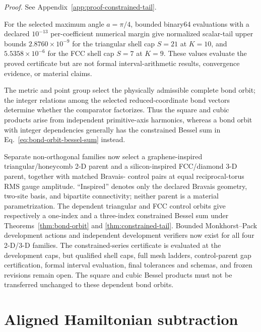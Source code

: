 \documentclass[11pt]{article}
\newenvironment{prospective}{\color{prospectivered}}{}
\begin{document}
\noindent\emph{Proof.} See Appendix~\ref{app:proof-constrained-tail}.


For the selected maximum angle $a=\pi/4$, bounded binary64 evaluations with a declared
$10^{-13}$ per-coefficient numerical margin give normalized scalar-tail upper bounds
$2.8760\times10^{-9}$ for the triangular shell cap $S=21$ at $K=10$, and
$5.5358\times10^{-6}$ for the FCC shell cap $S=7$ at $K=9$. These values evaluate the
proved certificate but are not formal interval-arithmetic results, convergence evidence,
or material claims.

The metric and point group select the physically admissible complete bond orbit; the
integer relations among the selected reduced-coordinate bond vectors determine whether
the comparator factorizes. Thus the square and cubic products arise from independent
primitive-axis harmonics, whereas a bond orbit with integer dependencies generally has
the constrained Bessel sum in Eq.~\eqref{eq:bond-orbit-bessel-sum} instead.

\begin{prospective}
Separate non-orthogonal families now select a graphene-inspired triangular/honeycomb
2-D parent and a silicon-inspired FCC/diamond 3-D parent, together with matched Bravais-
control pairs at equal reciprocal-torus RMS gauge amplitude. ``Inspired'' denotes only
the declared Bravais geometry, two-site basis, and bipartite connectivity; neither parent
is a material parametrization. The dependent triangular and FCC control orbits give
respectively a one-index and a three-index constrained Bessel sum under
Theorems~\ref{thm:bond-orbit} and \ref{thm:constrained-tail}. Bounded Monkhorst--Pack
development actions and independent development verifiers now exist for all four
2-D/3-D families. The constrained-series certificate is evaluated at the development
caps, but qualified shell caps, full mesh ladders, control-parent gap certification,
formal interval evaluation, final tolerances and schemas, and frozen revisions remain
open. The square and cubic Bessel products must not be transferred unchanged to
these dependent bond orbits.
\end{prospective}

\section{Aligned Hamiltonian subtraction}
\end{document}
